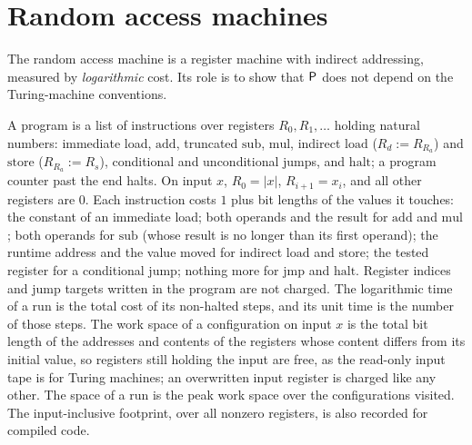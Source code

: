 \section{Random access machines}

The random access machine is a register machine with indirect addressing,
measured by \emph{logarithmic} cost. Its role is to show that $\mathsf{P}$ does not
depend on the Turing-machine conventions.

\begin{definition}
  \label{def:models-ram}
  \leanok
  A program is a list of instructions over registers $R_0, R_1, \dots$ holding
  natural numbers: immediate load, $\mathrm{add}$, truncated $\mathrm{sub}$,
  $\mathrm{mul}$, indirect $\mathrm{load}$ ($R_d := R_{R_a}$) and
  $\mathrm{store}$ ($R_{R_a} := R_s$), conditional and unconditional jumps, and
  $\mathrm{halt}$; a program counter past the end halts. On input $x$,
  $R_0 = |x|$, $R_{i+1} = x_i$, and all other registers are $0$. Each
  instruction costs $1$ plus bit lengths of the values it touches: the
  constant of an immediate load; both operands and the result for $\mathrm{add}$
  and $\mathrm{mul}$; both operands for $\mathrm{sub}$ (whose result is no
  longer than its first operand); the runtime address and the value moved for
  indirect $\mathrm{load}$ and $\mathrm{store}$; the tested register for a
  conditional jump; nothing more for $\mathrm{jmp}$ and $\mathrm{halt}$.
  Register indices and jump targets written in the program are not charged.
  The logarithmic time of a run is the total cost of its non-halted steps, and
  its unit time is the number of those steps. The work space of a
  configuration on input $x$ is the total bit length of the addresses and
  contents of the registers whose content differs from its initial value, so
  registers still holding the input are free, as the read-only input tape is
  for Turing machines; an overwritten input register is charged like any other.
  The space of a run is the peak work space over the configurations visited.
  The input-inclusive footprint, over all nonzero registers, is also recorded
  for compiled code.
\end{definition}

